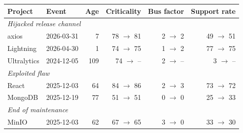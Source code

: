 \setlength{\tabcolsep}{4pt}
\begin{tabular}{llrrrr}
\toprule
Project & Event & Age & Criticality & Bus factor & Support rate \\
\midrule
\multicolumn{6}{l}{\textit{Hijacked release channel}} \\
axios & 2026-03-31 & 7 & 78 $\to$ 81 & 2 $\to$ 2 & 49 $\to$ 51 \\
Lightning & 2026-04-30 & 1 & 74 $\to$ 75 & 1 $\to$ 2 & 77 $\to$ 75 \\
Ultralytics & 2024-12-05 & 109 & 74 $\to$ -- & 2 $\to$ -- & 3 $\to$ -- \\
\multicolumn{6}{l}{\textit{Exploited flaw}} \\
React & 2025-12-03 & 64 & 84 $\to$ 86 & 2 $\to$ 3 & 73 $\to$ 72 \\
MongoDB & 2025-12-19 & 77 & 51 $\to$ 51 & 0 $\to$ 0 & 25 $\to$ 33 \\
\multicolumn{6}{l}{\textit{End of maintenance}} \\
MinIO & 2025-12-03 & 62 & 67 $\to$ 65 & 3 $\to$ 0 & 33 $\to$ 30 \\
\bottomrule
\end{tabular}
